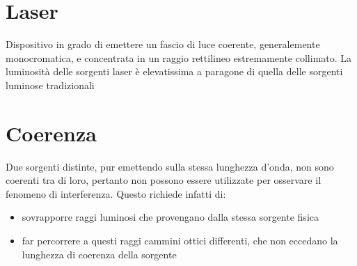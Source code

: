\documentclass[a4paper,11pt]{report}
\begin{document}
\section{Laser}

Dispositivo in grado di emettere un fascio di luce coerente, generalemente monocromatica, e concentrata in un raggio rettilineo estremamente collimato.
La luminosità delle sorgenti laser è elevatissima a paragone di quella delle sorgenti luminose tradizionali

\section{Coerenza}

Due sorgenti distinte, pur emettendo sulla stessa lunghezza d'onda, non sono coerenti tra di loro, pertanto non possono essere utilizzate per osservare il fenomeno di interferenza.
Questo richiede infatti di:

\begin{itemize}
    \item sovrapporre raggi luminosi che provengano dalla stessa sorgente fisica
    \item far percorrere a questi raggi cammini ottici differenti, che non eccedano la lunghezza di coerenza della sorgente
\end{itemize}
\end{document}
